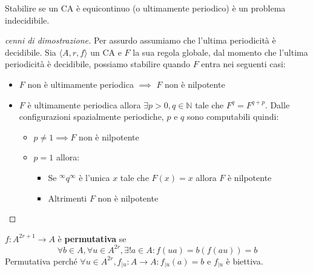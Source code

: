 \begin{teorema}
    Stabilire se un CA è equicontinuo (o ultimamente periodico) è un problema indecidibile.
    \begin{proof} [cenni di dimostrazione]
        Per assurdo assumiamo che l'ultima periodicità è decidibile. Sia 
        $\langle A,r,f\rangle$  un CA e $F$ la sua regola globale, dal momento
        che l'ultima periodicità è decidibile, possiamo stabilire quando $F$ entra 
        nei seguenti casi:
        \begin{itemize}
            \item $F$ non è ultimamente periodica $\implies$ $F$ non è nilpotente
            \item $F$ è ultimamente periodica allora $\exists p>0, q\in \mathbb{N}$
            tale che $F^q=F^{q+p}$. Dalle configurazioni spazialmente periodiche,
            $p$ e $q$ sono computabili quindi:
            \begin{itemize}
                \item $p\ne 1\implies F$ non è nilpotente
                \item $p= 1$ allora:
                \begin{itemize}
                    \item Se $^\infty q^\infty$ è l'unica $x$ tale che $F(x)=x$ allora
                    $F$ è nilpotente
                    \item Altrimenti $F$ non è nilpotente
                \end{itemize}
            \end{itemize}
        \end{itemize}
    \end{proof}
\end{teorema}

\begin{definizione}
    $f:A^{2r+1}\rightarrow A$ è \textbf{permutativa} se 
    $$\forall b\in A, \forall u \in A^{2r}, \exists ! a\in A: f(ua)=b (f(au))=b$$
    Permutativa perché $\forall u \in A^{2r}, f_{|u}:A\rightarrow A:f_{|u}(a) = b$
    e $f_{|u}$ è biettiva.
\end{definizione}